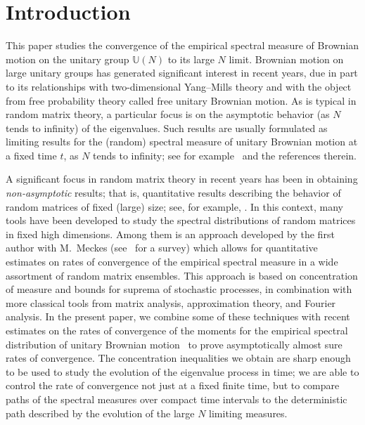 \documentclass[11pt]{article}
\theoremstyle{definition}
\numberwithin{equation}{section}
\numberwithin{figure}{section}
\numberwithin{table}{section}
\newcommand{\Unitary}[1]{\mathbb{U}\left(#1\right)}
\begin{document}
\section{Introduction}

This paper studies the convergence of the empirical spectral measure of Brownian motion on the unitary group $\Unitary{N}$ to its large $N$ limit. Brownian motion on large unitary groups has generated significant interest in recent years, due in part to its relationships with two-dimensional Yang--Mills theory and with the object from free probability theory called free unitary Brownian motion. As is typical in random matrix theory, a particular focus is on the asymptotic behavior (as $N$ tends to infinity) of the eigenvalues. Such results are usually formulated as limiting results for the (random) spectral measure of unitary Brownian motion at a fixed time $t$, as $N$ tends to infinity; see for example~\cite{Rains1997, Xu1997,Biane1997,Biane1997-2, Levy2008,LevyMaida2010,DHK2013, Kemp2015,CDK2016} and the references therein.

A significant focus in random matrix theory in recent years has been in obtaining
\emph{non-asymptotic} results; that is, quantitative results describing the behavior of random matrices of fixed (large) size; see, for example, \cite{RudVer10}. In this context, many tools have been developed to study the spectral distributions of random matrices in fixed high dimensions. Among them is an approach developed by the first author with M.~Meckes (see~\cite{MM2016} for a survey) which allows for quantitative estimates on rates of convergence of the empirical spectral measure in a wide assortment of random matrix ensembles. This approach is based on concentration of measure and bounds for suprema of stochastic processes, in combination with more classical tools from matrix analysis, approximation theory, and Fourier analysis. In the present paper, we combine some of these techniques with recent estimates on the rates of convergence of the moments for the empirical spectral distribution of unitary Brownian motion~\cite{CDK2016} to prove asymptotically almost sure rates of convergence. The concentration inequalities we obtain are sharp enough to be used to study the evolution of the eigenvalue process in time; we are able to control the rate of convergence not just at a fixed finite time, but to compare paths of the spectral measures over compact time intervals to the deterministic path described by the evolution of the large $N$ limiting measures.
\end{document}
